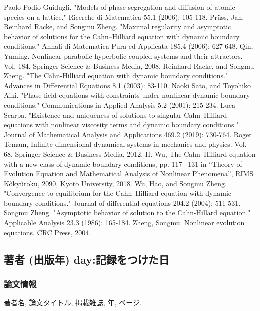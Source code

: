 \documentclass[a4paper]{article}
\begin{document}
\begin{thebibliography}{99}
		Paolo Podio-Guidugli. "Models of phase segregation and diffusion of atomic species on a lattice." Ricerche di Matematica 55.1 (2006): 105-118.
		Pr\"uss, Jan, Reinhard Racke, and Songmu Zheng. "Maximal regularity and asymptotic behavior of solutions for the Cahn–Hilliard equation with dynamic boundary conditions." Annali di Matematica Pura ed Applicata 185.4 (2006): 627-648.
		Qin, Yuming. Nonlinear parabolic-hyperbolic coupled systems and their attractors. Vol. 184. Springer Science \& Business Media, 2008.
		Reinhard Racke, and Songmu Zheng. "The Cahn-Hilliard equation with dynamic boundary conditions." Advances in Differential Equations 8.1 (2003): 83-110.
		Naoki Sato, and Toyohiko Aiki. "Phase field equations with constraints under nonlinear dynamic boundary conditions." Communications in Applied Analysis 5.2 (2001): 215-234.
		Luca Scarpa. "Existence and uniqueness of solutions to singular Cahn–Hilliard equations with nonlinear viscosity terms and dynamic boundary conditions." Journal of Mathematical Analysis and Applications 469.2 (2019): 730-764.
		Roger Temam, Infinite-dimensional dynamical systems in mechanics and physics. Vol. 68. Springer Science \& Business Media, 2012.
		H. Wu, The Cahn–Hilliard equation with a new class of dynamic boundary conditions, pp. 117– 131 in “Theory of Evolution Equation and Mathematical Analysis of Nonlinear Phenomena”, RIMS K\^oky\^uroku, 2090, Kyoto University, 2018.
		Wu, Hao, and Songmu Zheng. "Convergence to equilibrium for the Cahn–Hilliard equation with dynamic boundary conditions." Journal of differential equations 204.2 (2004): 511-531.
		Songmu Zheng. "Asymptotic behavior of solution to the Cahn-Hillard equation." Applicable Analysis 23.3 (1986): 165-184.
		Zheng, Songmu. Nonlinear evolution equations. CRC Press, 2004.
	\end{thebibliography}

\appendix

\subsection{著者 (出版年) day:記録をつけた日}
	\subsubsection{論文情報}
	著者名, 論文タイトル, 掲載雑誌, 年, ページ.
\end{document}
